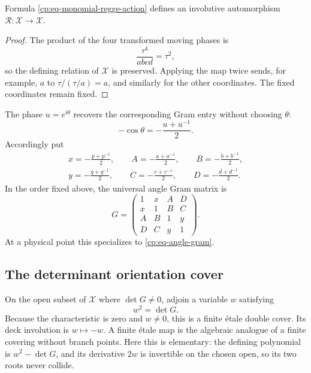 \begin{lemma}
\label{cp:lem-algebraic-regge-involution}
Formula \eqref{cp:eq-monomial-regge-action} defines an involutive
automorphism \(\mathcal R:\mathcal X\to\mathcal X\).
\end{lemma}

\begin{proof}
The product of the four transformed moving phases is
\[
 \frac{\tau^4}{abcd}=\tau^2,
\]
so the defining relation of \(\mathcal X\) is preserved.  Applying the map
twice sends, for example, \(a\) to \(\tau/(\tau/a)=a\), and similarly for
the other coordinates.  The fixed coordinates remain fixed.
\end{proof}

The phase \(u=e^{i\theta}\) recovers the corresponding Gram entry without
choosing \(\theta\):
\begin{equation}
 -\cos\theta=-\frac{u+u^{-1}}2.
 \label{cp:eq-phase-to-cosine}
\end{equation}
Accordingly put
\begin{equation}
 \begin{gathered}
 x=-\frac{p+p^{-1}}2,\qquad
 A=-\frac{a+a^{-1}}2,\qquad
 B=-\frac{b+b^{-1}}2,\\
 y=-\frac{q+q^{-1}}2,\qquad
 C=-\frac{c+c^{-1}}2,\qquad
 D=-\frac{d+d^{-1}}2.
 \end{gathered}
 \label{cp:eq-phase-gram-entries}
\end{equation}
In the order fixed above, the universal angle Gram matrix is
\begin{equation}
 G=
 \begin{pmatrix}
  1&x&A&D\\
  x&1&B&C\\
  A&B&1&y\\
  D&C&y&1
 \end{pmatrix}.
 \label{cp:eq-gram}
\end{equation}
At a physical point this specializes to \eqref{cp:eq-angle-gram}.

\subsection{The determinant orientation cover}
\label{cp:subsec-orientation-cover}

On the open subset of \(\mathcal X\) where \(\det G\ne0\), adjoin a
variable \(w\) satisfying
\begin{equation}
 w^2=\det G.
 \label{cp:eq-orientation-root}
\end{equation}
Because the characteristic is zero and \(w\ne0\), this is a finite
\'{e}tale double cover.  Its deck involution is \(w\mapsto-w\).
A finite \'{e}tale map is the algebraic analogue of a finite covering
without branch points.  Here this is elementary: the defining polynomial is
\(w^2-\det G\), and its derivative \(2w\) is invertible on the chosen open,
so its two roots never collide.

